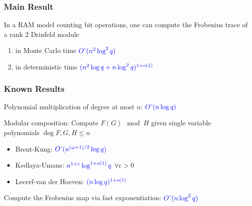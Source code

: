 \documentclass{beamer}
\newcommand{\blue}{\textcolor{blue}}
\newcommand{\spa}{\vspace{0.2cm}}
\newcommand{\spa}{\textnormal{ }}
\begin{document}
\begin{frame}
\frametitle{Main Result}




\begin{theorem}
In a RAM model counting bit operations, one can compute the Frobenius trace of a rank 2 Drinfeld module
\begin{enumerate}
\item in Monte Carlo time $\blue{O\tilde{~}(n^2 \log^2 q)}$
\item in deterministic time $\blue{(n^2 \log q + n \log^2 q)^{1+o(1)}}$

\end{enumerate}
\end{theorem}



\end{frame}






\begin{frame}
\frametitle{Known Results}

Polynomial multiplication of degree at most $n$: $\blue{O\tilde{~}(n\log q)}$


\spa

Modular composition: Compute $F(G) \mod H$ given single variable polynomials $\deg F, G,H \leq n$
\begin{itemize}
\item Brent-Kung: $\blue{O\tilde{~}(n^{(\omega+1)/2}\log q)} $ %
    \item Kedlaya-Umans: $\blue{n^{1 + \varepsilon}\log^{1+o(1)} q}$ $\forall \epsilon > 0 $
    \item Lecerf-van der Hoeven: $\blue{(n \log q)^{1+o(1)}}$
\end{itemize}



\spa

Compute the Frobenius map via fast exponentiation: $\blue{O\tilde{~}(n\log^2 q)}$ %
    


\end{frame}
\end{document}
